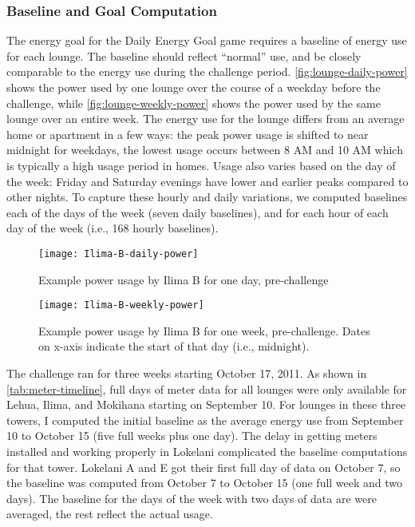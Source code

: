 \subsubsection{Baseline and Goal Computation}
\label{sec:baseline-computation}

The energy goal for the Daily Energy Goal game requires a baseline of energy use for each lounge. The baseline should reflect ``normal'' use, and be closely comparable to the energy use during the challenge period. \autoref{fig:lounge-daily-power} shows the power used by one lounge over the course of a weekday before the challenge, while \autoref{fig:lounge-weekly-power} shows the power used by the same lounge over an entire week. The energy use for the lounge differs from an average home or apartment in a few ways: the peak power usage is shifted to near midnight for weekdays, the lowest usage occurs between 8 AM and 10 AM which is typically a high usage period in homes. Usage also varies based on the day of the week: Friday and Saturday evenings have lower and earlier peaks compared to other nights. To capture these hourly and daily variations, we computed baselines each of the days of the week (seven daily baselines), and for each hour of each day of the week (i.e., 168 hourly baselines).

\begin{figure}[htbp]
	\centering
		\texttt{[image: Ilima-B-daily-power]}
		\caption{Example power usage by Ilima B for one day, pre-challenge}
\label{fig:lounge-daily-power}
\end{figure}

\begin{figure}[htbp]
	\centering
		\texttt{[image: Ilima-B-weekly-power]}
		\caption[Example power usage by Ilima B for one week, pre-challenge]{Example power usage by Ilima B for one week, pre-challenge. Dates on x-axis indicate the start of that day (i.e., midnight).}
\label{fig:lounge-weekly-power}
\end{figure}

The challenge ran for three weeks starting October 17, 2011. As shown in \autoref{tab:meter-timeline}, full days of meter data for all lounges were only available for Lehua, Ilima, and Mokihana starting on September 10. For lounges in these three towers, I computed the initial baseline as the average energy use from September 10 to October 15 (five full weeks plus one day). The delay in getting meters installed and working properly in Lokelani complicated the baseline computations for that tower. Lokelani A and E got their first full day of data on October 7, so the baseline was computed from October 7 to October 15 (one full week and two days). The baseline for the days of the week with two days of data are were averaged, the rest reflect the actual usage.

